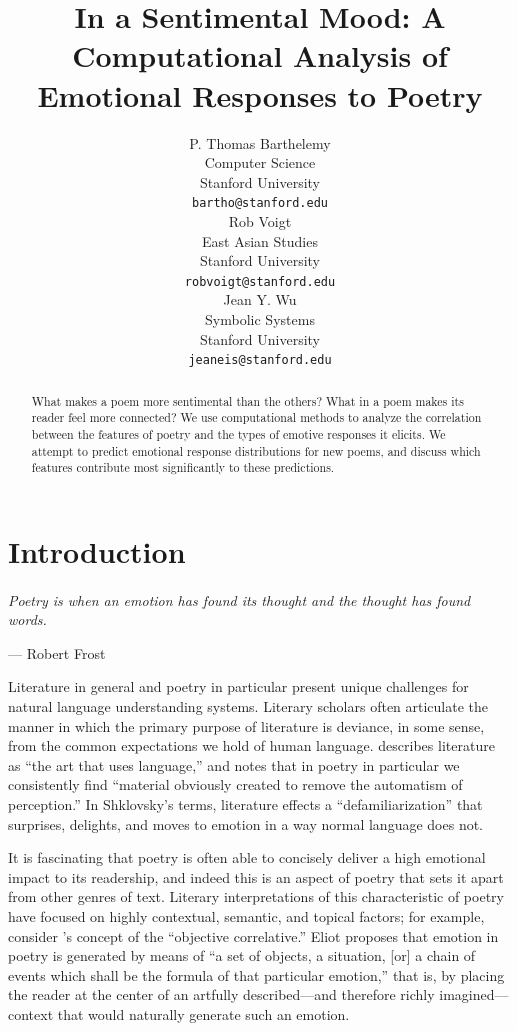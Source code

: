 \documentclass[11pt]{article}
\title{In a Sentimental Mood: A Computational Analysis of Emotional Responses to Poetry}
\author{P. Thomas Barthelemy \\
  Computer Science\\
  Stanford University \\
  {\tt bartho@stanford.edu} \\\And
  Rob Voigt \\
  East Asian Studies \\
  Stanford University \\
  {\tt robvoigt@stanford.edu} \\\And
  Jean Y. Wu \\
  Symbolic Systems  \\
  Stanford University\\
  {\tt jeaneis@stanford.edu} \\}
\date{}
\begin{document}
\maketitle
\begin{abstract}
What makes a poem more sentimental than the others? What in a poem makes its reader feel more connected? We use computational methods to analyze the correlation between the features of poetry and the types of emotive responses it elicits.
We attempt to predict emotional response distributions for new poems, and discuss which features contribute most significantly to these predictions. %
\end{abstract}

\section{Introduction}

\paragraph{}
\emph{Poetry is when an emotion has found its thought and the thought has found words.}
\begin{flushright}
--- Robert Frost\\
\end{flushright}


Literature in general and poetry in particular present unique challenges for natural language understanding systems. Literary scholars often articulate the manner in which the primary purpose of literature is deviance, in some sense, from the common expectations we hold of human language.  describes literature as ``the art that uses language,'' and  notes that in poetry in particular we consistently find ``material obviously created to remove the automatism of perception.'' In Shklovsky's terms, literature effects a ``defamiliarization'' that surprises, delights, and moves to emotion in a way normal language does not.

It is fascinating that poetry is often able to concisely deliver a high emotional impact to its readership, and indeed this is an aspect of poetry that sets it apart from other genres of text. Literary interpretations of this characteristic of poetry have focused on highly contextual, semantic, and topical factors; for example, consider 's concept of the ``objective correlative.'' Eliot proposes that emotion in poetry is generated by means of ``a set of objects, a situation, [or] a chain of events which shall be the formula of that particular emotion,'' that is, by placing the reader at the center of an artfully described---and therefore richly imagined---context that would naturally generate such an emotion.
\end{document}
